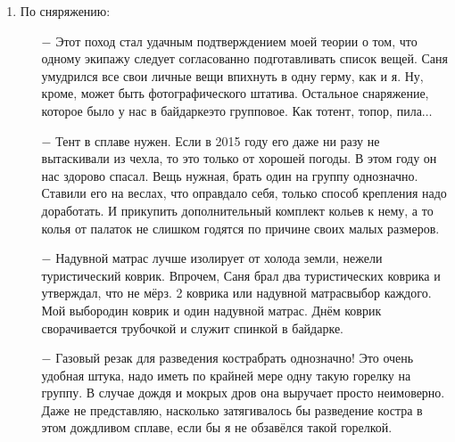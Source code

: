 \begin{enumerate}
\begin{enumerate}
	\item[$-$] 6 человек\mdash предельное количество народа, когда кончается порядок и начинается хаос. У нас был порядок, чему я несказанно рад. Все экипажи показали себя с лучшей стороны, преодолевая все встретившиеся нам трудности.
	\item[$-$] Ребенку одному в походе было скучновато. Лучше, если детей будет несколько. Тогда они организуют «междусобойчик». Сколько радости принесет им поход сознанием того, что взрослые взяли их на такое мероприятие!
	\item[$-$] Опыт чисто мужского похода показывает, что женщин с собой всё\sdash таки надо брать. В их присутствии мужчины стараются не выражаться крепко и вообще ведут себя по\sdash другому. Но и не надо забывать о сказанном Феликсом Квадригиным про женщин в походе. Впрочем, я хочу дополнить его слова о том, что женщины привносят хаос. Это, по моему мнению, касается незамужних дам. Замужние, обычно, пытаются командовать только своими мужьями, а не всеми подряд. Тут уже наше мужское дело давать этому отпор.
	\end{enumerate}	
\item По сняряжению:
	\begin{enumerate}
		\item[$-$] Этот поход стал удачным подтверждением моей теории о том, что одному экипажу следует согласованно подготавливать список вещей. Саня умудрился все свои личные вещи впихнуть в одну герму, как и я. Ну, кроме, может быть фотографического штатива. Остальное снаряжение, которое было у нас в байдарке\mdash это групповое. Как то\mdash тент, топор, пила$\ldots$
		\item[$-$] Тент в сплаве нужен. Если в 2015 году его даже ни разу не вытаскивали из чехла, то это только от хорошей погоды. В этом году он нас здорово спасал. Вещь нужная, брать один на группу однозначно. Ставили его на веслах, что оправдало себя, только способ крепления надо доработать. И прикупить дополнительный комплект кольев к нему, а то колья от палаток не слишком годятся по причине своих малых размеров.
		\item[$-$] Надувной матрас лучше изолирует от холода земли, нежели туристический коврик. Впрочем, Саня брал два туристических коврика и утверждал, что не мёрз. 2 коврика или надувной матрас\mdash выбор каждого. Мой выбор\mdash один коврик и один надувной матрас. Днём коврик сворачивается трубочкой и служит спинкой в байдарке.
		\item[$-$] Газовый резак для разведения костра\mdash брать однозначно! Это очень удобная штука, надо иметь по крайней мере одну такую горелку на группу. В случае дождя и мокрых дров она выручает просто неимоверно. Даже не представляю, насколько затягивалось бы разведение костра в этом дождливом сплаве, если бы я не обзавёлся такой горелкой.

\end{enumerate}
\end{enumerate}
